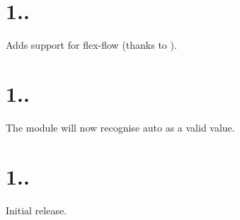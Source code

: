 \section*{1..}


\begin{DoxyItemize}
\item Adds support for {\ttfamily flex-\/flow} (thanks to ).
\end{DoxyItemize}

\section*{1..}


\begin{DoxyItemize}
\item The module will now recognise {\ttfamily auto} as a valid value.
\end{DoxyItemize}

\section*{1..}


\begin{DoxyItemize}
\item Initial release. 
\end{DoxyItemize}